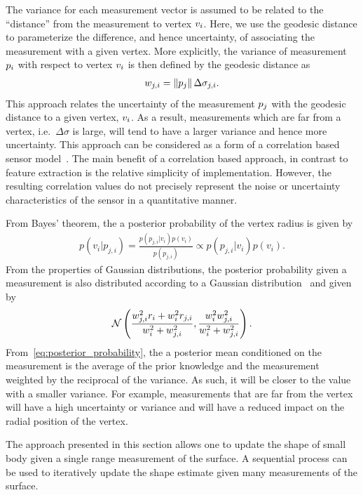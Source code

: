 \documentclass[journal]{new-aiaa}
\begin{document}
The variance for each measurement vector is assumed to be related to the ``distance'' from the measurement to vertex \( v_i \).
Here, we use the geodesic distance to parameterize the difference, and hence  uncertainty, of associating the measurement with a given vertex.
More explicitly, the variance of measurement \( p_i \) with respect to vertex \( v_i \) is then defined by the geodesic distance as
\begin{align}
    w_{j, i} = \left\| p_j \right\| \Delta \sigma_{j,i} .
\end{align}
This approach relates the uncertainty of the measurement \( p_j \) with the geodesic distance to a given vertex, \( v_i \).
As a result, measurements which are far from a vertex, i.e.\ \( \Delta \sigma \) is large, will tend to have a larger variance and hence more uncertainty. 
This approach can be considered as a form of a correlation based sensor model~\cite{thrun2005}.
The main benefit of a correlation based approach, in contrast to feature extraction is the relative simplicity of implementation.
However, the resulting correlation values do not precisely represent the noise or uncertainty characteristics of the sensor in a quantitative manner.

From Bayes' theorem, the a posterior probability of the vertex radius is given by
\begin{align}
    p(v_i | p_{j, i}) = \frac{p(p_{j, i} | v_i) p(v_i)}{p( p_{j, i})} \propto p(p_{j,i} | v_i) p(v_i).
\end{align}
From the properties of Gaussian distributions, the posterior probability given a measurement is also distributed according to a Gaussian distribution~\cite{bishop2006} and given by
\begin{align}\label{eq:posterior_probability}
    \mathcal{N} \left( \frac{w_{j, i}^2 r_i + w_i^2 r_{j, i}}{w_i^2 + w_{j, i}^2} , \frac{w_i^2  w_{j, i}^2}{w_i^2 +  w_{j, i}^2} \right) .
\end{align}
From~\cref{eq:posterior_probability}, the a posterior mean conditioned on the measurement is the average of the prior knowledge and the measurement weighted by the reciprocal of the variance. 
As such, it will be closer to the value with a smaller variance. 
For example, measurements that are far from the vertex will have a high uncertainty or variance and will have a reduced impact on the radial position of the vertex.

The approach presented in this section allows one to update the shape of small body given a single range measurement of the surface.
A sequential process can be used to iteratively update the shape estimate given many measurements of the surface. 
\end{document}
